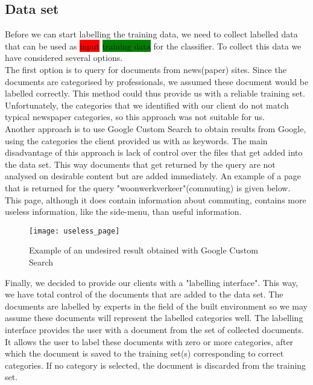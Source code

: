 \subsection{Data set}
Before we can start labelling the training data, we need to collect labelled data that can be used as \colorbox{red}{input} \colorbox{green}{training data} for the classifier. To collect this data we have considered several options.\\

The first option is to query for documents from news(paper) sites. Since the documents are categorised by professionals, we assumed these document would be labelled correctly. This method could thus provide us with a reliable training set.
Unfortunately, the categories that we identified with our client do not match typical newspaper categories, so this approach was not suitable for us.\\

Another approach is to use Google Custom Search to obtain results from Google, using the categories the client provided us with as keywords. The main disadvantage of this approach is lack of control over the files that get added into the data set. This way documents that get returned by the query are not analysed on desirable content but are added immediately. An example of a page that is returned for the query "woonwerkverkeer"(commuting) is given below. This page, although it does contain information about commuting, contains more useless information, like the side-menu, than useful information.\\

\begin{figure}[H]
\centering
\texttt{[image: useless\_page]}
\caption{Example of an undesired result obtained with Google Custom Search}
\label{fig:useless_page}
\end{figure}

Finally, we decided to provide our clients with a "labelling interface". This way, we have total control of the documents that are added to the data set. The documents are labelled by experts in the field of the built environment so we may assume these documents will represent the labelled categories well. The labelling interface provides the user with a document from the set of collected documents. It allows the user to label these documents with zero or more categories, after which the document is saved to the training set(s) corresponding to correct categories. If no category is selected, the document is discarded from the training set. 

